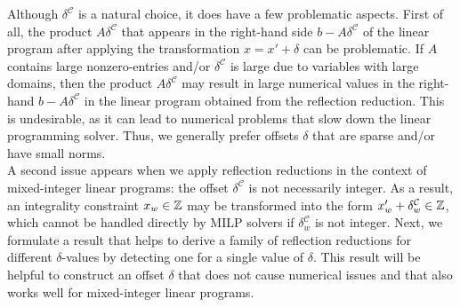 \documentclass[pdflatex,sn-mathphys-num]{sn-jnl}%
\theoremstyle{thmstyleone}%
\theoremstyle{thmstylethree}%
\theoremstyle{thmstyletwo}%
\begin{document}
Although $\delta^{\mathcal{C}}$ is a natural choice, it does have a few problematic aspects. First of all, the product $A \delta^\mathcal{C}$ that appears in the right-hand side $b- A \delta^\mathcal{C}$ of the linear program after applying the transformation $x = x' + \delta$ can be problematic. If $A$ contains large nonzero-entries and/or $\delta^\mathcal{C}$ is large due to variables with large domains, then the product $A\delta^\mathcal{C}$ may result in large numerical values in the right-hand $b- A \delta^\mathcal{C}$ in the linear program obtained from the reflection reduction. This is undesirable, as it can lead to numerical problems that slow down the linear programming solver. Thus, we generally prefer offsets $\delta$ that are sparse and/or have small norms.\\

A second issue appears when we apply reflection reductions in the context of mixed-integer linear programs: the offset $\delta^{\mathcal{C}}$ is not necessarily integer. As a result, an integrality constraint $x_w \in \mathbb{Z}$ may be transformed into the form $x'_{w} + \delta^\mathcal{C}_w \in \mathbb{Z}$, which cannot be handled directly by MILP solvers if $\delta^\mathcal{C}_w$ is not integer.
Next, we formulate a result that helps to derive a family of reflection reductions for different $\delta$-values by detecting one for a single value of $\delta$. This result will be helpful to construct an offset $\delta$ that does not cause numerical issues and that also works well for mixed-integer linear programs.\\
\end{document}
